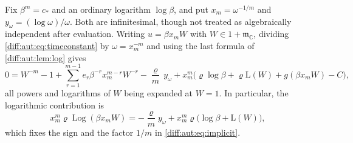 \documentclass[11pt,letterpaper]{article}
\numberwithin{equation}{section}
\theoremstyle{definition}
\theoremstyle{remark}
\newcommand{\C}{\mathbb C}
\newcommand{\mm}{\mathfrak m}
\newcommand{\Lmm}{\mathrm{L}}
\newcommand{\Log}{\operatorname{Log}}
\begin{document}
Fix $\beta^{m}=c_{\ast}$ and an ordinary logarithm $\log\beta$, and put
$x_{m}=\omega^{-1/m}$ and $y_{\omega}=(\log\omega)/\omega$. Both are infinitesimal,
though not treated as algebraically independent after evaluation. Writing
$u=\beta x_{m}W$ with $W\in1+\mm_{\C}$, dividing \cref{diff:aut:eq:timeconstant} by
$\omega=x_{m}^{-m}$ and using the last formula of \cref{diff:aut:lem:log} gives
\begin{equation}\label{diff:aut:eq:implicit}
 0=W^{-m}-1+\sum_{r=1}^{m-1}e_{r}\beta^{-r}x_{m}^{m-r}W^{-r}
 -\frac{\varrho}{m}\,y_{\omega}
 +x_{m}^{m}\bigl(\varrho\log\beta+\varrho\Lmm(W)+g(\beta x_{m}W)-C\bigr),
\end{equation}
all powers and logarithms of $W$ being expanded at $W=1$.
In particular, the logarithmic contribution is
\[
 x_m^m\varrho\Log(\beta x_mW)
 =-\frac{\varrho}{m}y_\omega
   +x_m^m\varrho\bigl(\log\beta+\Lmm(W)\bigr),
\]
which fixes the sign and the factor $1/m$ in
\cref{diff:aut:eq:implicit}.
\end{document}
